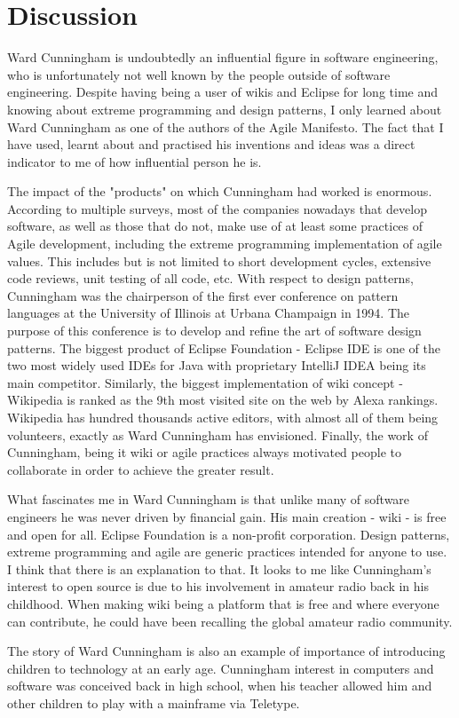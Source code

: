 \documentclass[11pt]{article}
\begin{document}
\section{Discussion}
Ward Cunningham is undoubtedly an influential figure in software engineering, who is unfortunately not well known by the people outside of software engineering. Despite having being a user of wikis and Eclipse for long time and knowing about extreme programming and design patterns, I only learned about Ward Cunningham as one of the authors of the Agile Manifesto. The fact that I have used, learnt about and practised his inventions and ideas was a direct indicator to me of how influential person he is.
\par
The impact of the "products" on which Cunningham had worked is enormous. According to multiple surveys\cite{hp-agile-report}\cite{pmi-agile-report}\cite{state-of-agile-report}, most of the companies nowadays that develop software, as well as those that do not, make use of at least some practices of Agile development, including the extreme programming implementation of agile values. This includes but is not limited to short development cycles, extensive code reviews, unit testing of all code, etc.
With respect to design  patterns, Cunningham was the chairperson of the first ever conference on pattern languages at the University of Illinois at Urbana Champaign in 1994.\cite{cs-encyclopedia} The purpose of this conference is to develop and refine the art of software design patterns.
The biggest product of Eclipse Foundation - Eclipse IDE is one of the two most widely used IDEs for Java with proprietary IntelliJ IDEA being its main competitor.\cite{rebellabse-report} Similarly, the biggest implementation of wiki concept - Wikipedia is ranked as the 9th most visited site on the web by Alexa rankings. Wikipedia has hundred thousands active editors\cite{wiki-community}, with almost all of them being volunteers, exactly as Ward Cunningham has envisioned. Finally, the work of Cunningham, being it wiki or agile practices always motivated people to collaborate in order to achieve the greater result.
\par
What fascinates me in Ward Cunningham is that unlike many of software engineers he was never driven by financial gain. His main creation - wiki - is free and open for all. Eclipse Foundation is a non-profit corporation. Design patterns, extreme programming and agile are generic practices intended for anyone to use. I think that there is an explanation to that. It looks to me like Cunningham's interest to open source is due to his involvement in amateur radio back in his childhood. When making wiki being a platform that is free and where everyone can contribute, he could have been recalling the global amateur radio community.
\par
The story of Ward Cunningham is also an example of importance of introducing children to technology at an early age. Cunningham interest in computers and software was conceived back in high school, when his teacher allowed him and other children to play with a mainframe via Teletype.
\end{document}
